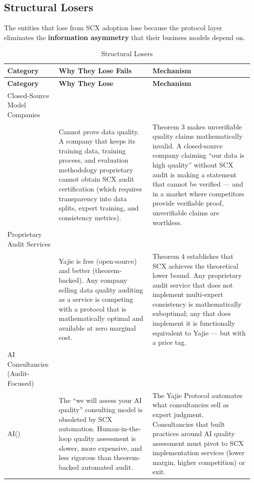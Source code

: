 \documentclass[12pt,a4paper]{article}
\theoremstyle{remark}
\begin{document}
\subsection{Structural Losers}
The entities that lose from SCX adoption lose because the protocol layer 
eliminates the \textbf{information asymmetry} that their business models depend on.
\begin{longtable}{@{}p{3cm} p{5cm} p{6cm}@{}}
\caption{Structural Losers} \\
\toprule
\textbf{Category } & \textbf{Why They Lose Fails} & \textbf{Mechanism } \\
\midrule
\endfirsthead
\midrule
\textbf{Category} & \textbf{Why They Lose} & \textbf{Mechanism} \\
\midrule
\endhead
\bottomrule
\endfoot
Closed-Source Model Companies\\ &
Cannot prove data quality. A company that keeps its training data, training 
process, and evaluation methodology proprietary cannot obtain SCX audit 
certification (which requires transparency into data splits, expert training, 
and consistency metrics). &
Theorem 3 makes unverifiable quality claims mathematically invalid. A closed-source 
company claiming ``our data is high quality'' without SCX audit is making a 
statement that cannot be verified --- and in a market where competitors provide 
verifiable proof, unverifiable claims are worthless. \\
\addlinespace
Proprietary Audit Services\\ &
Yajie is free (open-source) and better (theorem-backed). Any company selling 
data quality auditing as a service is competing with a protocol that is 
mathematically optimal and available at zero marginal cost. &
Theorem 4 establishes that SCX achieves the theoretical lower bound. Any 
proprietary audit service that does not implement multi-expert consistency 
is mathematically suboptimal; any that does implement it is functionally 
equivalent to Yajie --- but with a price tag. \\
\addlinespace
AI Consultancies (Audit-Focused)\\AI() &
The ``we will assess your AI quality'' consulting model is obsoleted by SCX 
automation. Human-in-the-loop quality assessment is slower, more expensive, 
and less rigorous than theorem-backed automated audit. &
The Yajie Protocol automates what consultancies sell as expert judgment. 
Consultancies that built practices around AI quality assessment must pivot 
to SCX implementation services (lower margin, higher competition) or exit. \\

\end{longtable}
\end{document}
